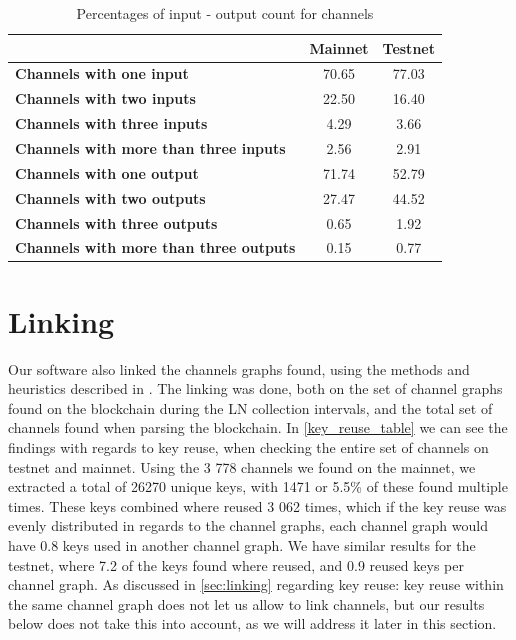 \begin{table}[]
\centering
\caption{Percentages of input - output count for channels}
\label{channel_input_output}
\begin{tabular}{|l|c|c|}
\hline
                                                                     & \textbf{Mainnet} & \textbf{Testnet} \\ \hline
\textbf{Channels with one input}             & 70.65            & 77.03            \\ \hline
\textbf{Channels with two inputs}            & 22.50            & 16.40            \\ \hline
\textbf{Channels with three inputs}          & 4.29             & 3.66             \\ \hline
\textbf{Channels with more than three inputs} & 2.56             & 2.91             \\ \hline
\textbf{Channels with one output}             & 71.74            & 52.79            \\ \hline
\textbf{Channels with two outputs}             & 27.47            & 44.52            \\ \hline
\textbf{Channels with three outputs}          & 0.65             & 1.92             \\ \hline
\textbf{Channels with more than three outputs} & 0.15             & 0.77             \\ \hline
\end{tabular}
\end{table}

\section{Linking}

Our software also linked the channels graphs found, using the methods and heuristics described in .
The linking was done, both on the set of channel graphs found on the blockchain during the LN collection intervals, and the total set of channels found when parsing the blockchain. In \cref{key_reuse_table} we can see the findings with regards to key reuse, when checking the entire set of channels on testnet and mainnet. Using the 3 778 channels we found on the mainnet, we extracted a total of 26270 unique keys, with 1471 or 5.5\% of these found multiple times. These keys combined where reused 3 062 times, which if the key reuse was evenly distributed in regards to the channel graphs, each channel graph would have 0.8 keys used in another channel graph. We have similar results for the testnet, where 7.2 of the keys found where reused, and 0.9 reused keys per channel graph. As discussed in \cref{sec:linking} regarding key reuse: key reuse within the same channel graph does not let us allow to link channels, but our results below does not take this into account, as we will address it later in this section.

